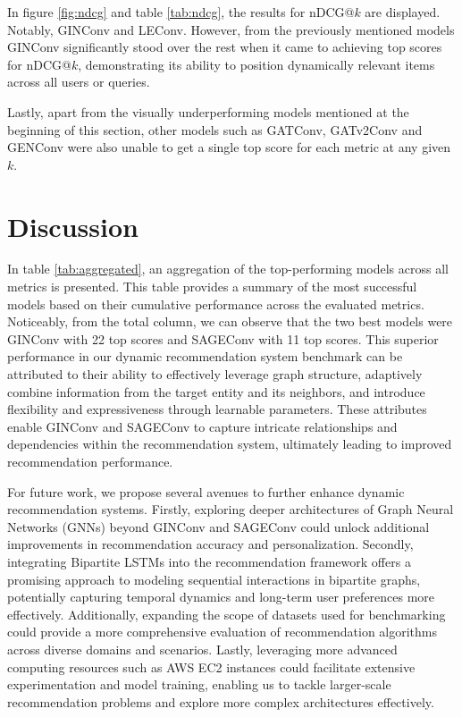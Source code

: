 \documentclass{scrartcl}
\begin{document}
In figure \ref{fig:ndcg} and table \ref{tab:ndcg}, the results for nDCG@$k$ are displayed. Notably, GINConv and LEConv. However, from the previously mentioned models GINConv significantly stood over the rest when it came to achieving top scores for nDCG@$k$, demonstrating its ability to position dynamically relevant items across all users or queries.

Lastly, apart from the visually underperforming models mentioned at the beginning of this section, other models such as GATConv, GATv2Conv and GENConv were also unable to get a single top score for each metric at any given $k$.



\section{Discussion}

\quad In table \ref{tab:aggregated}, an aggregation of the top-performing models across all metrics is presented. This table provides a summary of the most successful models based on their cumulative performance across the evaluated metrics. Noticeably, from the total column, we can observe that the two best models were GINConv with 22 top scores and SAGEConv with 11 top scores. This superior performance in our dynamic recommendation system benchmark can be attributed to their ability to effectively leverage graph structure, adaptively combine information from the target entity and its neighbors, and introduce flexibility and expressiveness through learnable parameters. These attributes enable GINConv and SAGEConv to capture intricate relationships and dependencies within the recommendation system, ultimately leading to improved recommendation performance.

For future work, we propose several avenues to further enhance dynamic recommendation systems. Firstly, exploring deeper architectures of Graph Neural Networks (GNNs) beyond GINConv and SAGEConv could unlock additional improvements in recommendation accuracy and personalization. Secondly, integrating Bipartite LSTMs into the recommendation framework offers a promising approach to modeling sequential interactions in bipartite graphs, potentially capturing temporal dynamics and long-term user preferences more effectively. Additionally, expanding the scope of datasets used for benchmarking could provide a more comprehensive evaluation of recommendation algorithms across diverse domains and scenarios. Lastly, leveraging more advanced computing resources such as AWS EC2 instances could facilitate extensive experimentation and model training, enabling us to tackle larger-scale recommendation problems and explore more complex architectures effectively.
\end{document}
